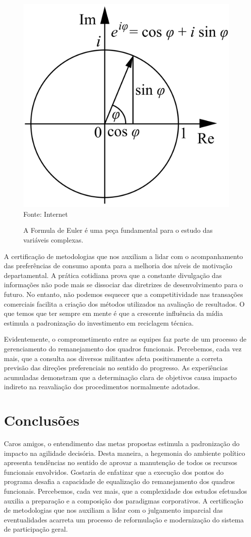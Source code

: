 \documentclass[fleqn]{profmat-cefet}
\begin{document}
\begin{figure}
    \centering
    \caption[Formula de Euler] %
    {A Formula de Euler é uma peça fundamental para o estudo das variáveis complexas.}
    \label{fig:euler}
    \includegraphics[width=.3\linewidth]{figs/euler}
    \\ Fonte: Internet
\end{figure}

A certificação de metodologias que nos auxiliam a lidar com o acompanhamento das
preferências de consumo aponta para a melhoria dos níveis de motivação
departamental. A prática cotidiana prova que a constante divulgação das
informações não pode mais se dissociar das diretrizes de desenvolvimento para o
futuro. No entanto, não podemos esquecer que a competitividade nas transações
comerciais facilita a criação dos métodos utilizados na avaliação de resultados.
O que temos que ter sempre em mente é que a crescente influência da mídia
estimula a padronização do investimento em reciclagem técnica. 

Evidentemente, o comprometimento entre as equipes faz parte de um processo de
gerenciamento do remanejamento dos quadros funcionais. Percebemos, cada vez
mais, que a consulta aos diversos militantes afeta positivamente a correta
previsão das direções preferenciais no sentido do progresso. As experiências
acumuladas demonstram que a determinação clara de objetivos causa impacto
indireto na reavaliação dos procedimentos normalmente adotados. 

\chapter{Conclusões}
\label{cap:conclusoes}

Caros amigos, o entendimento das metas propostas estimula a padronização do
impacto na agilidade decisória. Desta maneira, a hegemonia do ambiente político
apresenta tendências no sentido de aprovar a manutenção de todos os recursos
funcionais envolvidos. Gostaria de enfatizar que a execução dos pontos do
programa desafia a capacidade de equalização do remanejamento dos quadros
funcionais. Percebemos, cada vez mais, que a complexidade dos estudos efetuados
auxilia a preparação e a composição dos paradigmas corporativos. A certificação
de metodologias que nos auxiliam a lidar com o julgamento imparcial das
eventualidades acarreta um processo de reformulação e modernização do sistema de
participação geral. 
\end{document}
